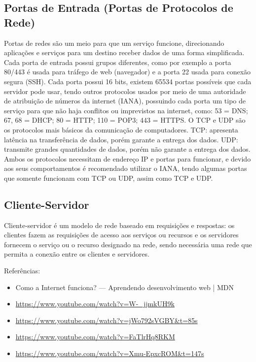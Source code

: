 	\subsection*{Portas de Entrada (Portas de Protocolos de Rede)}
	
	Portas de redes são um meio para que um serviço funcione, direcionando aplicações e serviços para um destino receber dados de uma forma simplificada. Cada porta de entrada possui grupos diferentes, como por exemplo a porta 80/443 é usada para tráfego de web (navegador) e a porta 22 usada para conexão segura (SSH). Cada porta possui 16 bits, existem 65534 portas possíveis que cada servidor pode usar, tendo outros protocolos usados por meio de uma autoridade de atribuição de números da internet (IANA), possuindo cada porta um tipo de serviço para que não haja conflitos ou imprevistos na internet, como: 53 = DNS; 67, 68 = DHCP; 80 = HTTP; 110 = POP3; 443 = HTTPS. O TCP e UDP são os protocolos mais básicos da comunicação de computadores. TCP: apresenta latência na transferência de dados, porém garante a entrega dos dados. UDP: transmite grandes quantidades de dados, porém não garante a entrega dos dados. Ambos os protocolos necessitam de endereço IP e portas para funcionar, e devido aos seus comportamentos é recomendado utilizar o IANA, tendo algumas portas que somente funcionam com TCP ou UDP, assim como TCP e UDP.
	
	\subsection*{Cliente-Servidor}
	
	Cliente-servidor é um modelo de rede baseado em requisições e respostas: os clientes fazem as requisições de acesso aos serviços ou recursos e os servidores fornecem o serviço ou o recurso designado na rede, sendo necessária uma rede que permita a conexão entre os clientes e servidores.
	
	Referências:
	\begin{itemize}
		\item Como a Internet funciona? --- Aprendendo desenvolvimento web | MDN
		\item \url{https://www.youtube.com/watch?v=W-_jjmkUH9k}
		\item \url{https://www.youtube.com/watch?v=jWo792sVGBY&t=85s}
		\item \url{https://www.youtube.com/watch?v=FaTlrHq8RKM}
		\item \url{https://www.youtube.com/watch?v=Xmu-EpxcROM&t=147s}
	\end{itemize}
	
